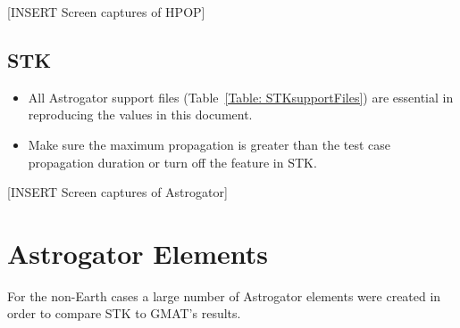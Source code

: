 [INSERT Screen captures of HPOP]

\subsection{STK}
\begin{itemize}
  \item All Astrogator support files (Table~\ref{Table:
  STKsupportFiles}) are essential in reproducing the values in this
  document.
  \item Make sure the maximum propagation is greater than the test
  case propagation duration or turn off the feature in STK.
\end{itemize}

[INSERT Screen captures of Astrogator]

\clearpage
\section{Astrogator Elements}
\label{Sec: STK AstroElements}

For the non-Earth cases a large number of Astrogator elements were
created in order to compare STK to GMAT's results.


